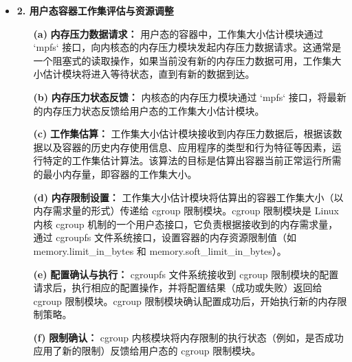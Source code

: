 \begin{itemize}
    \item \textbf{2. 用户态容器工作集评估与资源调整}
    \begin{itemize}
        \item[\textbf{(a)}] \textbf{内存压力数据请求：} 用户态的容器中，工作集大小估计模块通过 `mpfs` 接口，向内核态的内存压力模块发起内存压力数据请求。这通常是一个阻塞式的读取操作，如果当前没有新的内存压力数据可用，工作集大小估计模块将进入等待状态，直到有新的数据到达。
        \item[\textbf{(b)}] \textbf{内存压力状态反馈：} 内核态的内存压力模块通过 `mpfs` 接口，将最新的内存压力状态反馈给用户态的工作集大小估计模块。
        \item[\textbf{(c)}] \textbf{工作集估算：} 工作集大小估计模块接收到内存压力数据后，根据该数据以及容器的历史内存使用信息、应用程序的类型和行为特征等因素，运行特定的工作集估计算法。该算法的目标是估算出容器当前正常运行所需的最小内存量，即容器的工作集大小。
        \item[\textbf{(d)}] \textbf{内存限制设置：} 工作集大小估计模块将估算出的容器工作集大小（以内存需求量的形式）传递给 cgroup 限制模块。cgroup 限制模块是 Linux 内核 cgroup 机制的一个用户态接口，它负责根据接收到的内存需求量，通过 cgroupfs 文件系统接口，设置容器的内存资源限制值（如 memory.limit\_in\_bytes 和 memory.soft\_limit\_in\_bytes）。
        \item[\textbf{(e)}] \textbf{配置确认与执行：} cgroupfs 文件系统接收到 cgroup 限制模块的配置请求后，执行相应的配置操作，并将配置结果（成功或失败）返回给 cgroup 限制模块。cgroup 限制模块确认配置成功后，开始执行新的内存限制策略。
        \item[\textbf{(f)}] \textbf{限制确认：} cgroup 内核模块将内存限制的执行状态（例如，是否成功应用了新的限制）反馈给用户态的 cgroup 限制模块。
    \end{itemize}


\end{itemize}

